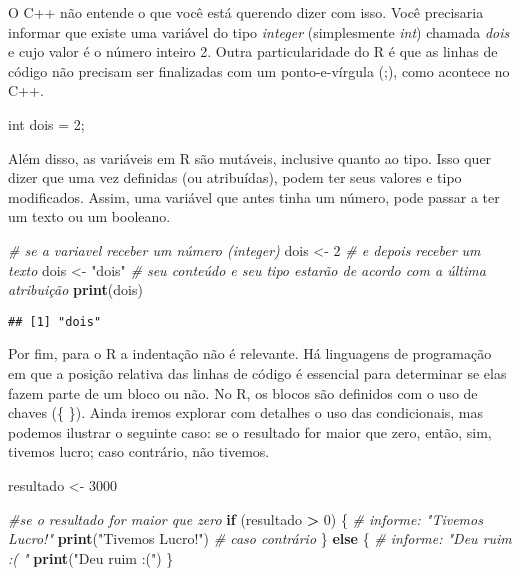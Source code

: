 \documentclass[
]{book}
\newenvironment{Shaded}{\begin{snugshade}}{\end{snugshade}}
\newcommand{\CommentTok}[1]{\textcolor[rgb]{0.56,0.35,0.01}{\textit{#1}}}
\newcommand{\ControlFlowTok}[1]{\textcolor[rgb]{0.13,0.29,0.53}{\textbf{#1}}}
\newcommand{\DecValTok}[1]{\textcolor[rgb]{0.00,0.00,0.81}{#1}}
\newcommand{\KeywordTok}[1]{\textcolor[rgb]{0.13,0.29,0.53}{\textbf{#1}}}
\newcommand{\NormalTok}[1]{#1}
\newcommand{\OperatorTok}[1]{\textcolor[rgb]{0.81,0.36,0.00}{\textbf{#1}}}
\newcommand{\StringTok}[1]{\textcolor[rgb]{0.31,0.60,0.02}{#1}}
\begin{document}
O C++ não entende o que você está querendo dizer com isso. Você precisaria informar que existe uma variável do tipo \emph{integer} (simplesmente \emph{int}) chamada \emph{dois} e cujo valor é o número inteiro 2. Outra particularidade do R é que as linhas de código não precisam ser finalizadas com um ponto-e-vírgula (;), como acontece no C++.

\begin{Shaded}
\begin{Highlighting}[]
\NormalTok{int dois =}\StringTok{ }\DecValTok{2}\NormalTok{;}
\end{Highlighting}
\end{Shaded}

Além disso, as variáveis em R são mutáveis, inclusive quanto ao tipo. Isso quer dizer que uma vez definidas (ou atribuídas), podem ter seus valores e tipo modificados. Assim, uma variável que antes tinha um número, pode passar a ter um texto ou um booleano.

\begin{Shaded}
\begin{Highlighting}[]
\CommentTok{# se a variavel receber um número (integer)}
\NormalTok{dois <-}\StringTok{ }\DecValTok{2}
\CommentTok{# e depois receber um texto}
\NormalTok{dois <-}\StringTok{ "dois"}
\CommentTok{# seu conteúdo e seu tipo estarão de acordo com a última atribuição}
\KeywordTok{print}\NormalTok{(dois)}
\end{Highlighting}
\end{Shaded}

\begin{verbatim}
## [1] "dois"
\end{verbatim}

Por fim, para o R a indentação não é relevante. Há linguagens de programação em que a posição relativa das linhas de código é essencial para determinar se elas fazem parte de um bloco ou não. No R, os blocos são definidos com o uso de chaves (\{ \}). Ainda iremos explorar com detalhes o uso das condicionais, mas podemos ilustrar o seguinte caso: se o resultado for maior que zero, então, sim, tivemos lucro; caso contrário, não tivemos.

\begin{Shaded}
\begin{Highlighting}[]
\NormalTok{resultado <-}\StringTok{ }\DecValTok{3000}

\CommentTok{#se o resultado for maior que zero}
\ControlFlowTok{if}\NormalTok{ (resultado }\OperatorTok{>}\StringTok{ }\DecValTok{0}\NormalTok{) \{ }
  \CommentTok{# informe: "Tivemos Lucro!"}
  \KeywordTok{print}\NormalTok{(}\StringTok{"Tivemos Lucro!"}\NormalTok{) }
  \CommentTok{# caso contrário}
\NormalTok{\} }\ControlFlowTok{else}\NormalTok{ \{  }
  \CommentTok{# informe: "Deu ruim :( "}
  \KeywordTok{print}\NormalTok{(}\StringTok{"Deu ruim :("}\NormalTok{) }
\NormalTok{\}}
\end{Highlighting}
\end{Shaded}
\end{document}
